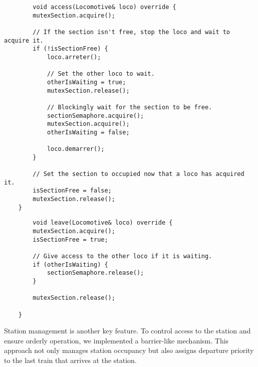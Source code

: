 \documentclass{article}
\begin{document}
    \begin{lstlisting}
        void access(Locomotive& loco) override {
        mutexSection.acquire();

        // If the section isn't free, stop the loco and wait to acquire it.
        if (!isSectionFree) {
            loco.arreter();

            // Set the other loco to wait.
            otherIsWaiting = true;
            mutexSection.release();

            // Blockingly wait for the section to be free.
            sectionSemaphore.acquire();
            mutexSection.acquire();
            otherIsWaiting = false;

            loco.demarrer();
        }

        // Set the section to occupied now that a loco has acquired it.
        isSectionFree = false;
        mutexSection.release();
    }
    \end{lstlisting}

    \begin{lstlisting}
        void leave(Locomotive& loco) override {
        mutexSection.acquire();
        isSectionFree = true;

        // Give access to the other loco if it is waiting.
        if (otherIsWaiting) {
            sectionSemaphore.release();
        }

        mutexSection.release();

    }
    \end{lstlisting}

    Station management is another key feature. To control access to the station and ensure orderly operation, we implemented a barrier-like mechanism. This approach not only manages station occupancy but also assigns departure priority to the last train that arrives at the station.
\end{document}
